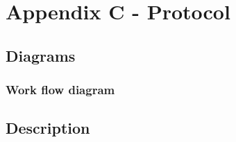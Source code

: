 \section{Appendix C - Protocol}


\subsection{Diagrams}


\subsubsection{Work flow diagram}

\subsection{Description}


